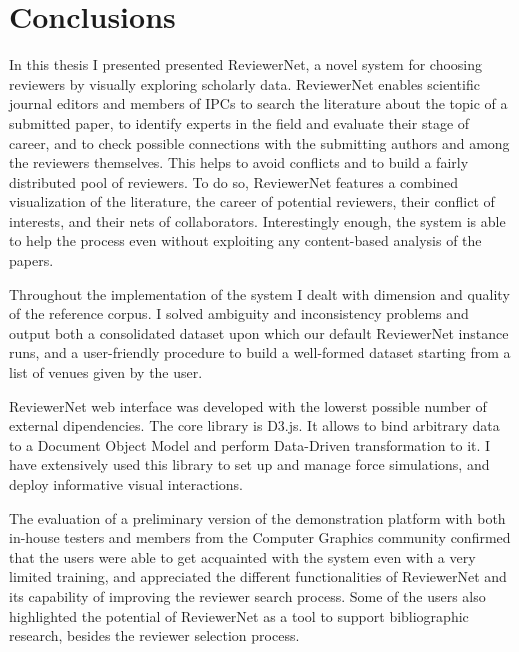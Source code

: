 
\chapter{Conclusions}
\label{sec:conclusions}

In this thesis I presented presented ReviewerNet, a novel system for choosing reviewers by visually exploring scholarly data. ReviewerNet enables scientific journal editors and members of IPCs to search the literature about the topic of a submitted paper, to identify experts in the field and evaluate their stage of career, and to check possible connections with the submitting authors and among the reviewers themselves. This helps to avoid conflicts and to build a fairly distributed pool of reviewers. To do so, ReviewerNet features a combined visualization of the literature, the career of potential reviewers, their conflict of interests, and their nets of collaborators. Interestingly enough, the system is able to help the process even without exploiting any content-based analysis of the papers.

Throughout the implementation of the system I dealt with dimension and quality of the reference corpus. I solved ambiguity and inconsistency problems and output both a consolidated dataset upon which our default ReviewerNet instance runs, and a user-friendly procedure to build a well-formed dataset starting from a list of venues given by the user. 

ReviewerNet web interface was developed with the lowerst possible number of external dipendencies. The core library is D3.js. It allows to bind arbitrary data to a Document Object Model and perform Data-Driven transformation to it. I have extensively used this library to set up and manage force simulations, and deploy informative visual interactions. 

The evaluation of a preliminary version of the demonstration platform with both in-house testers and members from the Computer Graphics community confirmed that the users were able to get acquainted with the system even with a very limited training, and  appreciated the different functionalities of ReviewerNet and its capability of improving the reviewer search process.  
Some of the users also highlighted the potential of ReviewerNet as a tool to support bibliographic research, besides the reviewer selection process. 

